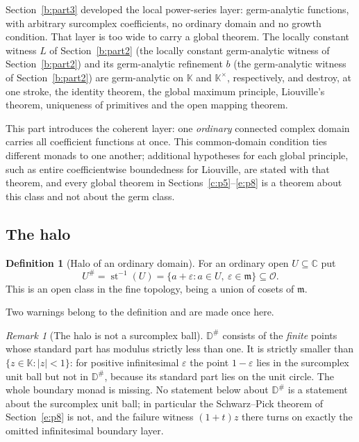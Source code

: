 \documentclass[11pt,a4paper]{article}
\numberwithin{equation}{section}
\theoremstyle{definition}
\newtheorem{definition}[theorem]{Definition}
\theoremstyle{remark}
\newtheorem{remark}[theorem]{Remark}
\theoremstyle{plain}
\newcommand{\K}{\mathbb K}
\newcommand{\CC}{\mathbb C}
\newcommand{\Ov}{\mathcal O}
\newcommand{\mm}{\mathfrak m}
\DeclareMathOperator{\st}{st}
\newcommand{\tm}{t}
\newcommand{\halo}[1]{#1^{\#}}
\newcommand{\abs}[1]{\lvert #1\rvert}
\begin{document}
Section~\ref{b:part3} developed the local power-series layer: germ-analytic functions,
with arbitrary surcomplex coefficients, no ordinary domain and no growth
condition. That layer is too wide to carry a global theorem. The
locally constant witness $L$ of Section~\ref{b:part2}
(the locally constant germ-analytic witness of Section~\ref{b:part2}) and its germ-analytic refinement
$b$ (the germ-analytic witness of Section~\ref{b:part2}) are germ-analytic on $\K$ and
$\K^\times$, respectively, and
destroy, at one stroke, the identity theorem, the global maximum
principle, Liouville's theorem, uniqueness of primitives and the open
mapping theorem.

This part introduces the coherent layer: one \emph{ordinary} connected
complex domain carries all coefficient functions at once. This common-domain
condition ties different monads to one another; additional hypotheses
for each global principle, such as entire coefficientwise boundedness
for Liouville, are stated with that theorem, and every global theorem in
Sections~\ref{c:p5}--\ref{e:p8} is a theorem about this class and not about
the germ class.

\subsection{The halo}
\label{c:p4:halo}

\begin{definition}[Halo of an ordinary domain]\label{c:p4:def-halo}
For an ordinary open $U\subseteq\CC$ put
\begin{equation}\label{c:p4:eq-halo}
 \halo U=\st^{-1}(U)=\{a+\varepsilon: a\in U,\ \varepsilon\in\mm\}
 \subseteq\Ov .
\end{equation}
This is an open class in the fine topology, being a union of cosets of
$\mm$.
\end{definition}

Two warnings belong to the definition and are made once here.

\begin{remark}[The halo is not a surcomplex ball]\label{c:p4:rk-notball}
$\halo{\mathbb D}$ consists of the \emph{finite} points whose standard
part has modulus strictly less than one. It is strictly smaller than
$\{z\in\K:\abs z<1\}$: for positive infinitesimal $\varepsilon$ the
point $1-\varepsilon$ lies in the surcomplex unit ball but not in
$\halo{\mathbb D}$, because its standard part lies on the unit circle.
The whole boundary monad is missing. No statement below about
$\halo{\mathbb D}$ is a statement about the surcomplex unit ball; in
particular the Schwarz--Pick theorem of Section~\ref{e:p8} is not, and
the failure witness $(1+\tm)z$ there turns on exactly the omitted
infinitesimal boundary layer.
\end{remark}
\end{document}
